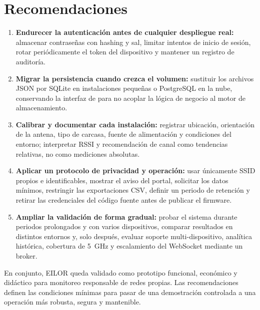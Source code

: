 \section{Recomendaciones}

\begin{enumerate}[leftmargin=1.8em]
  \item \textbf{Endurecer la autenticación antes de cualquier despliegue real:}
  almacenar contraseñas con hashing y sal, limitar intentos de inicio de sesión,
  rotar periódicamente el token del dispositivo y mantener un registro de auditoría.

  \item \textbf{Migrar la persistencia cuando crezca el volumen:} sustituir los
  archivos JSON por SQLite en instalaciones pequeñas o PostgreSQL en la nube,
  conservando la interfaz de  para no acoplar la lógica de negocio
  al motor de almacenamiento.

  \item \textbf{Calibrar y documentar cada instalación:} registrar ubicación,
  orientación de la antena, tipo de carcasa, fuente de alimentación y condiciones
  del entorno; interpretar RSSI y recomendación de canal como tendencias relativas,
  no como mediciones absolutas.

  \item \textbf{Aplicar un protocolo de privacidad y operación:} usar únicamente
  SSID propios e identificables, mostrar el aviso del portal, solicitar los datos
  mínimos, restringir las exportaciones CSV, definir un periodo de retención y
  retirar las credenciales del código fuente antes de publicar el firmware.

  \item \textbf{Ampliar la validación de forma gradual:} probar el sistema durante
  periodos prolongados y con varios dispositivos, comparar resultados en distintos
  entornos y, solo después, evaluar soporte multi-dispositivo, analítica histórica,
  cobertura de 5~GHz y escalamiento del WebSocket mediante un broker.
\end{enumerate}

\noindent En conjunto, EILOR queda validado como prototipo funcional, económico y
didáctico para monitoreo responsable de redes propias. Las recomendaciones definen
las condiciones mínimas para pasar de una demostración controlada a una operación
más robusta, segura y mantenible.
